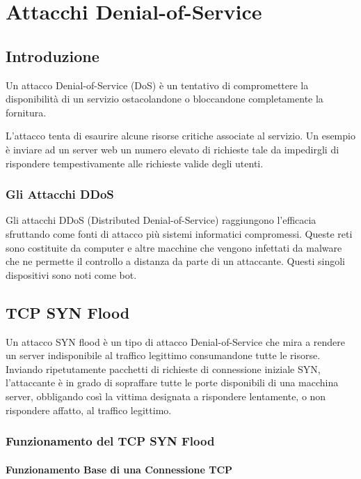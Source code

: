\chapter{Attacchi Denial-of-Service}

\section{Introduzione}

Un attacco Denial-of-Service (DoS) è un tentativo di compromettere la disponibilità di un servizio ostacolandone o bloccandone completamente la fornitura.

L'attacco tenta di esaurire alcune risorse critiche associate al servizio. Un esempio è inviare ad un server web un numero elevato di richieste tale da impedirgli di rispondere tempestivamente alle richieste valide degli utenti.

\subsection{Gli Attacchi DDoS}

Gli attacchi DDoS (Distributed Denial-of-Service) raggiungono l'efficacia sfruttando come fonti di attacco più sistemi informatici compromessi. Queste reti sono costituite da computer e altre macchine che vengono infettati da malware che ne permette il controllo a distanza da parte di un attaccante. Questi singoli dispositivi sono noti come bot.

\section{TCP SYN Flood}

Un attacco SYN flood è un tipo di attacco Denial-of-Service che mira a rendere un server indisponibile al traffico legittimo consumandone tutte le risorse. Inviando ripetutamente pacchetti di richieste di connessione iniziale SYN, l'attaccante è in grado di sopraffare tutte le porte disponibili di una macchina server, obbligando così la vittima designata a rispondere lentamente, o non rispondere affatto, al traffico legittimo.

\subsection{Funzionamento del TCP SYN Flood}

\subsubsection{Funzionamento Base di una Connessione TCP}

